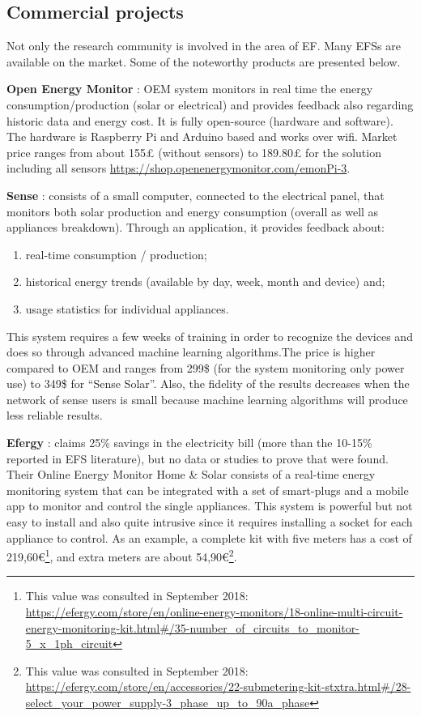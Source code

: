 \subsection{Commercial projects}

Not only the research community is involved in the area of \ac{EF}. Many \acp{EFS} are available on the market. Some of the noteworthy products are presented below.



\textbf{Open Energy Monitor} \cite{HomeEnergy}: \ac{OEM} system monitors in real time the energy consumption/production (solar or electrical) and provides feedback also regarding historic data and energy cost. It is fully open-source (hardware and software). The hardware is Raspberry Pi and Arduino based and works over wifi. Market price ranges from about 155£ (without sensors) to 189.80£   for the solution including all sensors \url{https://shop.openenergymonitor.com/emonPi-3}.


\textbf{Sense} \cite{sense}: consists of a small computer, connected to the electrical panel, that monitors both solar production and energy consumption (overall as well as appliances breakdown). Through an application, it provides feedback about: 
\begin{enumerate}
    \item real-time consumption / production; 
    \item historical energy trends (available by day, week, month and device) and; 
    \item usage statistics for individual appliances.
\end{enumerate}

 This system requires a few weeks of training in order to recognize the devices and does so through advanced machine learning algorithms.The price is higher compared to \ac{OEM} and ranges from 299\$ (for the system monitoring only power use) to 349\$ for “Sense Solar”. Also, the fidelity of the results decreases when the network of sense users is small because machine learning algorithms will produce less reliable results.



\textbf{Efergy} \cite{efergy}:
claims 25\% savings in the electricity bill (more than the 10-15\% reported in \ac{EFS} literature), but no data or studies to prove that were found. Their Online Energy Monitor Home \& Solar consists of a real-time energy monitoring system that can be integrated with a set of smart-plugs and a mobile app to monitor and control the single appliances. This system is powerful but not easy to install and also quite intrusive since it requires installing a socket for each appliance to control. As an example, a complete kit with five meters has a cost of 219,60€\footnote{This value was consulted in September 2018: \url{https://efergy.com/store/en/online-energy-monitors/18-online-multi-circuit-energy-monitoring-kit.html\#/35-number_of_circuits_to_monitor-5_x_1ph_circuit}}, and extra meters are about 54,90€\footnote{This value was consulted in September 2018: \url{https://efergy.com/store/en/accessories/22-submetering-kit-stxtra.html\#/28-select_your_power_supply-3_phase_up_to_90a_phase}}.



